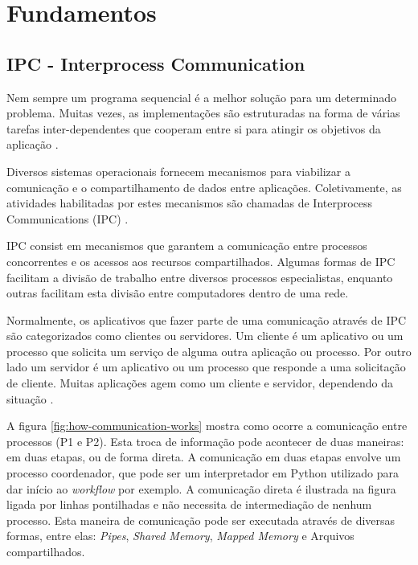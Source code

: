 \chapter[Fundamentos]{Fundamentos}


\section{IPC - Interprocess Communication}\label{sec:ipc}

Nem sempre um programa sequencial é a melhor solução para um determinado problema. Muitas vezes, as implementações são estruturadas na forma de várias tarefas inter-dependentes que cooperam entre si para atingir os objetivos da aplicação \cite{sistemas-op-mazierro}.

Diversos sistemas operacionais fornecem mecanismos para viabilizar a comunicação e o compartilhamento de dados entre aplicações. Coletivamente, as atividades habilitadas por estes mecanismos são chamadas de Interprocess Communications (IPC) \cite{microsoft-ipc}.

IPC consist em mecanismos que garantem a comunicação entre processos concorrentes e os acessos aos recursos compartilhados. Algumas formas de IPC facilitam a divisão de trabalho entre diversos processos especialistas, enquanto outras facilitam esta divisão entre computadores dentro de uma rede.

Normalmente, os aplicativos que fazer parte de uma comunicação através de IPC são categorizados como clientes ou servidores. Um cliente é um aplicativo ou um processo que solicita um serviço de alguma outra aplicação ou processo. Por outro lado um servidor é um aplicativo ou um processo que responde a uma solicitação de cliente. Muitas aplicações agem como um cliente e servidor, dependendo da situação \cite{microsoft-ipc}.

A figura \ref{fig:how-communication-works} mostra como ocorre a comunicação entre processos (P1 e P2). Esta troca de informação pode acontecer de duas maneiras: em duas etapas, ou de forma direta. A comunicação em duas etapas envolve um processo coordenador, que pode ser um interpretador em Python utilizado para dar início ao \textit{workflow} por exemplo. A comunicação direta é ilustrada na figura ligada por linhas pontilhadas e não necessita de intermediação de nenhum processo. Esta maneira de comunicação pode ser executada através de diversas formas, entre elas: \textit{Pipes}, \textit{Shared Memory}, \textit{Mapped Memory} e Arquivos compartilhados.

